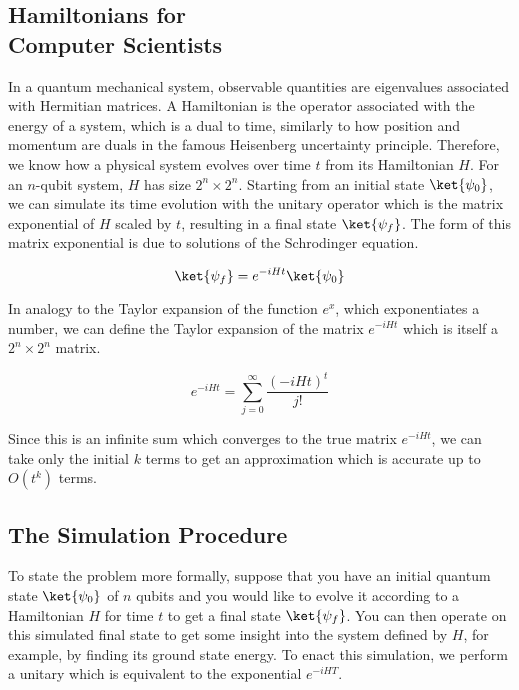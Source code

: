 \subsection{Hamiltonians for \\ Computer Scientists}

In a quantum mechanical system, observable quantities are eigenvalues
associated with Hermitian matrices. A Hamiltonian is the operator associated
with the energy of a system, which is a dual to time, similarly to how
position and momentum are duals in the famous Heisenberg uncertainty principle.
Therefore, we know
how a physical system evolves over time $t$ from its Hamiltonian $H$. For
an $n$-qubit system, $H$ has size $2^n \times 2^n$.
Starting from an initial state $\ket{\psi_0}$, we can simulate its time
evolution with the unitary operator which is the
matrix exponential of $H$ scaled by $t$, resulting in a final state $\ket{\psi_f}$.
The form of this matrix exponential is due to solutions of the Schrodinger
equation.

\begin{equation}
\ket{\psi_f} = e^{-iHt} \ket{\psi_0}
\end{equation}

In analogy to 
the Taylor expansion of the function $e^x$, which exponentiates a number,
we can define the Taylor expansion of the matrix $e^{-iHt}$ which is itself
a $2^n\times 2^n$ matrix.

\begin{equation}
e^{-iHt} = \sum_{j=0}^{\infty} \frac{(-iHt)^t}{j!}
\end{equation}

Since this is an infinite sum which converges to the true matrix
$e^{-iHt}$, we can take only the initial $k$ terms to get an approximation
which is accurate up to $O(t^k)$ terms.

\subsection{The Simulation Procedure}

To state the problem more formally, suppose that you have an initial
quantum state $\ket{\psi_0}$ of $n$ qubits
and you would like to evolve it according to a Hamiltonian $H$ for time
$t$ to get
a final state $\ket{\psi_f}$. You can then operate on this simulated final state
to get some insight into the system defined by $H$, for example, by finding
its ground state energy.
To
enact this simulation, we perform a unitary which is equivalent to the
exponential $e^{-iHT}$.

